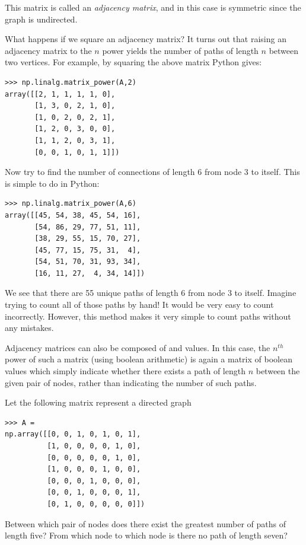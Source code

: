 This matrix is called an \emph{adjacency matrix}, and in this case is 
symmetric since the graph is undirected.

What happens if we square an adjacency matrix?
It turns out that raising an adjacency matrix to the $n$ power yields the number of paths of length $n$ between two vertices.
For example, by squaring the above matrix Python gives:
\begin{lstlisting}
>>> np.linalg.matrix_power(A,2)
array([[2, 1, 1, 1, 1, 0],
       [1, 3, 0, 2, 1, 0],
       [1, 0, 2, 0, 2, 1],
       [1, 2, 0, 3, 0, 0],
       [1, 1, 2, 0, 3, 1],
       [0, 0, 1, 0, 1, 1]])
\end{lstlisting}

Now try to find the number of connections of length 6 from node 3 to itself.
This is simple to do in Python:
\begin{lstlisting}
>>> np.linalg.matrix_power(A,6)
array([[45, 54, 38, 45, 54, 16],
       [54, 86, 29, 77, 51, 11],
       [38, 29, 55, 15, 70, 27],
       [45, 77, 15, 75, 31,  4],
       [54, 51, 70, 31, 93, 34],
       [16, 11, 27,  4, 34, 14]])
\end{lstlisting}
We see that there are 55 unique paths of length 6 from node 3 to itself.
Imagine trying to count all of those paths by hand!
It would be very easy to count incorrectly.
However, this method makes it very simple to count paths without any mistakes.

Adjacency matrices can also be composed of  and  values. 
In this case, the $n^{th}$ power of such a matrix (using boolean arithmetic) 
is again a matrix of
boolean values which simply indicate whether there exists a path of length $n$ between the given pair of nodes, rather than indicating the number of such
paths.

\begin{problem}
Let the following matrix represent a directed graph
\begin{lstlisting}
>>> A = 
np.array([[0, 0, 1, 0, 1, 0, 1],
          [1, 0, 0, 0, 0, 1, 0],
          [0, 0, 0, 0, 0, 1, 0],
          [1, 0, 0, 0, 1, 0, 0],
          [0, 0, 0, 1, 0, 0, 0],
          [0, 0, 1, 0, 0, 0, 1],
          [0, 1, 0, 0, 0, 0, 0]])
\end{lstlisting}

Between which pair of nodes does there exist the greatest number of paths
of length five?
From which node to which node is there no path of length seven?
\end{problem}

